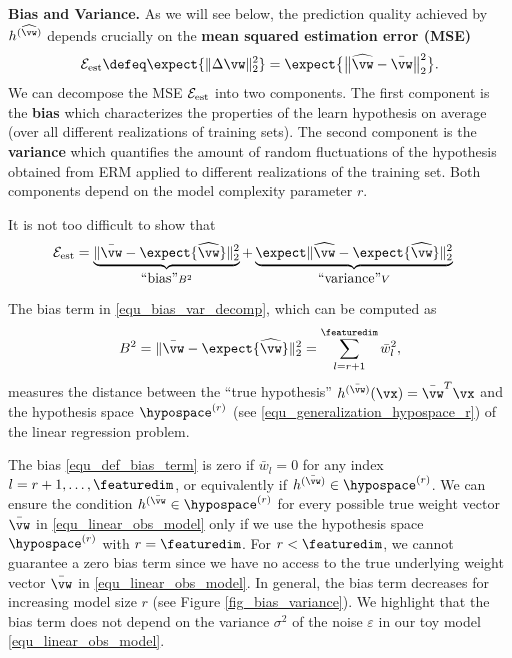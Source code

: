 \documentclass[12pt]{report}
\begin{document}
{\bf Bias and Variance.} 
As we will see below, the prediction quality achieved by $h^{(\widehat{\vw})}$ 
depends crucially on the {\bf mean squared estimation error (MSE)}
\begin{equation}
\label{equ_def_est_err}
\mathcal{E}_{\rm est} \defeq \expect \{  \| \Delta \vw \|^{2}_{2} \} =  \expect \big\{ \big \| \widehat{\vw} - \bar{\vw} \big\|^{2}_{2} \big \}. 
\end{equation}
We can decompose the MSE $\mathcal{E}_{\rm est}$ into two components. 
The first component is the {\bf bias} which characterizes the properties of 
the learn hypothesis on average (over all different realizations of training sets). 
The second component is the {\bf variance} which quantifies the amount of 
random fluctuations of the hypothesis obtained from ERM applied to 
different realizations of the training set. Both components depend on the model 
complexity parameter $r$. 

It is not too difficult to show that 
\vspace*{-1mm}
\begin{align}
\label{equ_bias_var_decomp}
\mathcal{E}_{\rm est} & = \underbrace{ \| \bar{\vw} - \expect \{ \widehat{\vw} \} \|^{2}_{2} }_{\mbox{``bias''} B^2}+ \underbrace{\expect \| \widehat{\vw} - \expect \{ \widehat{\vw} \} \|^{2}_{2}}_{\mbox{``variance''} V} 
\end{align} 

The bias term in \eqref{equ_bias_var_decomp}, which can be computed as 
\vspace*{-3mm}
\begin{equation}
\label{equ_def_bias_term}
B^{2} = \| \bar{\vw} - \expect \{ \widehat{\vw} \} \|^{2}_{2} = \sum_{l=r+1}^{\featuredim} \bar{w}_{l}^2, 
\end{equation} 
measures the distance between the ``true hypothesis'' $h^{(\bar{\vw})}(\vx)=\bar{\vw}^{T} \vx$ 
and the hypothesis space $\hypospace^{(r)}$ (see \eqref{equ_generalization_hypospace_r}) of 
the linear regression problem. 

The bias \eqref{equ_def_bias_term} is zero if $\bar{w}_{l}=0$ for any index 
$l=r+1,\ldots,\featuredim$, or equivalently if $h^{(\bar{\vw})} \in \hypospace^{(r)}$. 
We can ensure the condition $h^{(\bar{\vw}} \in \hypospace^{(r)}$ for every 
possible true weight vector $\bar{\vw}$ in \eqref{equ_linear_obs_model} only if we 
use the hypothesis space $\hypospace^{(r)}$ with $r=\featuredim$. 
For $r < \featuredim$, we cannot guarantee a zero bias term since we 
have no access to the true underlying weight vector $\bar{\vw}$ 
in \eqref{equ_linear_obs_model}. In general, the bias term decreases for 
increasing model size $r$ (see Figure \ref{fig_bias_variance}). We 
highlight that the bias term does not depend on the variance 
$\sigma^{2}$ of the noise $\varepsilon$ in our toy model \eqref{equ_linear_obs_model}. 
\end{document}
